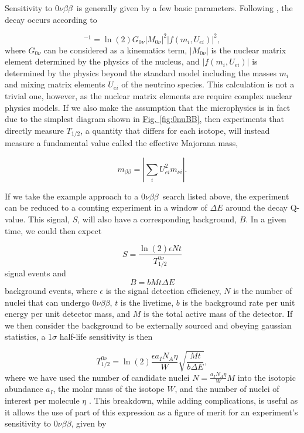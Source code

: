 \documentclass[12pt,a4paper]{article}
\newcommand{\zeronubb}{$0\nu \beta \beta$}
\begin{document}
Sensitivity to \zeronubb~is generally given by a few basic parameters. Following \cite{Barea:2013bz}, the decay occurs according to

\begin{equation}
[T^{0\nu}_{1/2}]^{-1} = \ln(2) G_{0\nu}|M_{0\nu}|^2|f(m_i,U_{ei})|^2,
\label{eq:Half-Life}
\end{equation}
where $G_{0\nu}$ can be considered as a kinematics term, $|M_{0\nu}|$ is the nuclear matrix element determined by the physics of the nucleus, and $|f(m_i,U_{ei})|$ is determined by the physics beyond the standard model including the masses $m_i$ and mixing matrix elements $U_{ei}$ of the neutrino species. This calculation is not a trivial one, however, as the nuclear matrix elements are require complex nuclear physics models. If we also make the assumption that the microphysics is in fact due to the simplest diagram shown in \hyperref[fig:0nuBB]{Fig. \ref*{fig:0nuBB}}, then experiments that directly measure $T_{1/2}$, a quantity that differs for each isotope, will instead measure a fundamental value called the effective Majorana mass,

\begin{equation}
m_{\beta\beta}=|\sum_{i}U^2_{ei}m_{\nu i}|.
\end{equation}



If we take the example approach to a \zeronubb~search listed above, the experiment can be reduced to a counting experiment in a window of $\Delta E$ around the decay Q-value. This signal, $S$, will also have a corresponding background, $B$. In a given time, we could then expect 

\begin{equation}
S = \frac{\ln(2)\epsilon Nt}{T^{0\nu}_{1/2}}
\end{equation}
signal events and 
\begin{equation}
B = bMt\Delta E
\end{equation} 
background events, where $\epsilon$ is the signal detection efficiency, $N$ is the number of nuclei that can undergo \zeronubb, $t$ is the livetime, $b$ is the background rate per unit energy per unit detector mass, and $M$ is the total active mass of the detector. If we then consider the background to be externally sourced and obeying gaussian statistics, a 1$\sigma$ half-life sensitivity is then

\begin{equation}
T^{0\nu}_{1/2} = \ln(2)\frac{\epsilon a_I N_A \eta}{W} \sqrt{\frac{Mt}{b\Delta E}},
\end{equation}
where we have used the number of candidate nuclei $N = \frac{a_I N_A \eta}{W}M$ into the isotopic abundance $a_I$, the molar mass of the isotope $W$, and the number of nuclei of interest per molecule $\eta$ \cite{Alessandria:2011rc}. This breakdown, while adding complications, is useful as it allows the use of part of this expression as a figure of merit for an experiment's sensitivity to \zeronubb, given by
\end{document}
